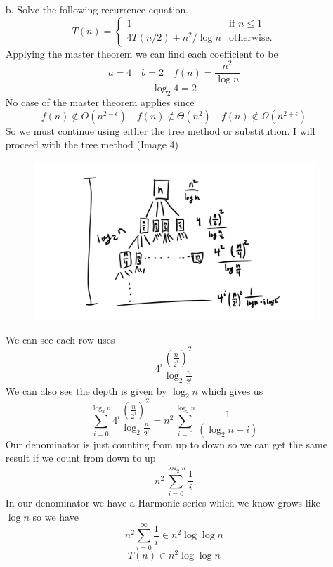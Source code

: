 \documentclass{article}
\begin{document}
\begin{itemize}
\item [b.] Solve the following recurrence equation. \\
\begin{equation*}
T(n) =
\begin{cases}
1 &\text{if $n\leq 1$}\\
4T(n/2)+n^2/\log n &\text{otherwise.}
\end{cases}
\end{equation*}
Applying the master theorem we can find each coefficient to be
$$ a=4 \quad b=2 \quad f(n)=\frac{n^2}{\log{n}}$$
$$ \log_{2}{4}=2 $$
No case of the master theorem applies since
$$f(n)\notin O(n^{2-\epsilon}) \quad f(n)\notin \Theta(n^2) \quad f(n)\notin \Omega(n^{2+\epsilon})$$
So we must continue using either the tree method or substitution.
I will proceed with the tree method (Image 4)
\begin{figure}
    \includegraphics[width=\linewidth]{Image 4.png}
\end{figure}
We can see each row uses
$$4^i \frac{(\frac{n}{2^i})^2}{\log_{2}{\frac{n}{2^i}}}$$
We can also see the depth is given by $\log_{2}{n}$ which gives us
$$ \sum_{i=0}^{\log_{2}{n}} 4^i \frac{(\frac{n}{2^i})^2}{\log_{2}{\frac{n}{2^i}}} =
n^2 \sum_{i=0}^{\log_{2}{n}} \frac{1}{(\log_{2}{n} - i)} $$
Our denominator is just counting from up to down so we can get the same result if we count from down to up
$$ n^2 \sum_{i=0}^{\log_{2}{n}} \frac{1}{i} $$
In our denominator we have a Harmonic series which we know grows like $\log{n}$ so we have
$$n^2 \sum_{i=0}^{\infty} \frac{1}{i} \in n^2\log\log{n} $$
$$ T(n) \in n^2\log\log{n} $$




\end{itemize}
\end{document}
